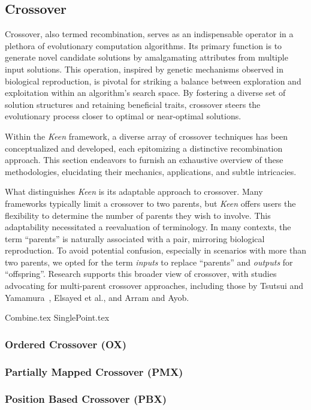 \subsection{Crossover}
\label{sec:keen:op:cx}
  Crossover, also termed recombination, serves as an indispensable operator in 
  a plethora of evolutionary computation algorithms. Its primary function is to 
  generate novel candidate solutions by amalgamating attributes from multiple 
  input solutions. This operation, inspired by genetic mechanisms observed in 
  biological reproduction, is pivotal for striking a balance between 
  exploration and exploitation within an algorithm's search space. By fostering 
  a diverse set of solution structures and retaining beneficial traits, 
  crossover steers the evolutionary process closer to optimal or near-optimal 
  solutions.

  Within the \textit{Keen} framework, a diverse array of crossover techniques 
  has been conceptualized and developed, each epitomizing a distinctive 
  recombination approach. This section endeavors to furnish an exhaustive 
  overview of these methodologies, elucidating their mechanics, applications, 
  and subtle intricacies.

  What distinguishes \textit{Keen} is its adaptable approach to crossover. Many 
  frameworks typically limit a crossover to two parents, but \textit{Keen} 
  offers users the flexibility to determine the number of parents they wish to 
  involve. This adaptability necessitated a reevaluation of terminology. In 
  many contexts, the term \enquote{parents} is naturally associated with a 
  pair, mirroring biological reproduction. To avoid potential confusion, 
  especially in scenarios with more than two parents, we opted for the term 
  \textit{inputs} to replace \enquote{parents} and \textit{outputs} for 
  \enquote{offspring}. Research supports this broader view of crossover, with 
  studies advocating for multi-parent crossover approaches, including those by 
  Tsutsui and Yamamura~\autocite{tsutsuiMultiparentRecombinationSimplex1999}, 
  Elsayed et al.\autocite{elsayedGANewMultiparent2011}, and Arram and 
  Ayob\autocite{arramNovelMultiparentOrder2019}.
  
  {Combine.tex}
  {SinglePoint.tex}
  
  \subsubsection{Ordered Crossover (OX)}
  \label{sec:keen:op:cx:ordered}
    \Blindtext
  \subsubsection{Partially Mapped Crossover (PMX)}
  \label{sec:keen:op:cx:partially_mapped}
    \Blindtext
  \subsubsection{Position Based Crossover (PBX)}
  \label{sec:keen:op:cx:position_based}
    \Blindtext
  